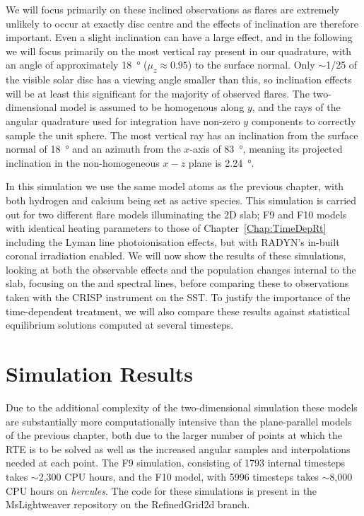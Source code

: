We will focus primarily on these inclined observations as flares are extremely unlikely to occur at exactly disc centre and the effects of inclination are therefore important.
Even a slight inclination can have a large effect, and in the following we will focus primarily on the most vertical ray present in our quadrature, with an angle of approximately \SI{18}{\degree} ($\mu_z\approx0.95$) to the surface normal.
Only $\sim$1/25 of the visible solar disc has a viewing angle smaller than this, so inclination effects will be at least this significant for the majority of observed flares.
The two-dimensional model is assumed to be homogenous along $y$, and the rays of the angular quadrature used for integration have non-zero $y$ components to correctly sample the unit sphere.
The most vertical ray has an inclination from the surface normal of \SI{18}{\degree} and an azimuth from the $x$-axis of \SI{83}{\degree}, meaning its projected inclination in the non-homogeneous $x-z$ plane is \SI{2.24}{\degree}.

In this simulation we use the same model atoms as the previous chapter, with both hydrogen and calcium being set as active species.
This simulation is carried out for two different flare models illuminating the 2D slab; F9 and F10 models with identical heating parameters to those of Chapter~\ref{Chap:TimeDepRt} including the Lyman line photoionisation effects, but with RADYN's in-built coronal irradiation enabled.
We will now show the results of these simulations, looking at both the observable effects and the population changes internal to the slab, focusing on the \Ha{} and \CaLine{} spectral lines, before comparing these to observations taken with the CRISP instrument on the SST.
To justify the importance of the time-dependent treatment, we will also compare these results against statistical equilibrium solutions computed at several timesteps.


\section{Simulation Results}\label{Sec:2dSimResults}

Due to the additional complexity of the two-dimensional simulation these models are substantially more computationally intensive than the plane-parallel models of the previous chapter, both due to the larger number of points at which the RTE is to be solved as well as the increased angular samples and interpolations needed at each point.
The F9 simulation, consisting of 1793 internal timesteps takes $\sim$2,300 CPU hours, and the F10 model, with 5996 timesteps takes $\sim$8,000 CPU hours on \emph{hercules}.
{\color{Red} The code for these simulations is present in the MsLightweaver repository on the RefinedGrid2d branch.}


